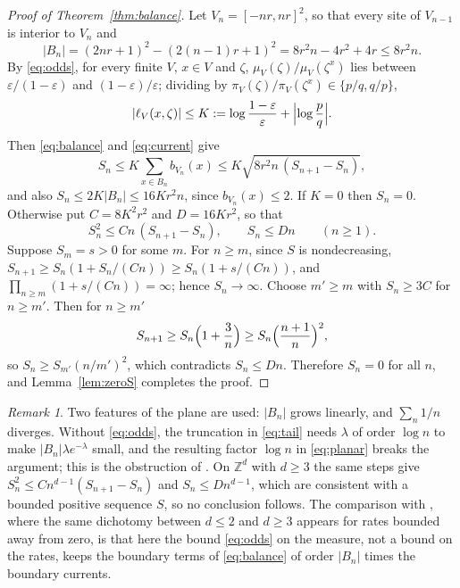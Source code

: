 \documentclass[11pt]{amsart}
\theoremstyle{remark}
\newtheorem{remark}[theorem]{Remark}
\newcommand{\Z}{\mathbb{Z}}
\begin{document}
\begin{proof}[Proof of Theorem~\ref{thm:balance}]
Let $V_n=[-nr,nr]^2$, so that every site of $V_{n-1}$ is interior to $V_n$ and
\begin{equation}\label{eq:shellsize}
|B_n|=(2nr+1)^2-(2(n-1)r+1)^2=8r^2n-4r^2+4r\le8r^2n .
\end{equation}
By \eqref{eq:odds}, for every finite $V$, $x\in V$ and $\zeta$, $\mu_V(\zeta)/\mu_V(\zeta^x)$ lies between
$\varepsilon/(1-\varepsilon)$ and $(1-\varepsilon)/\varepsilon$; dividing by $\pi_V(\zeta)/\pi_V(\zeta^x)\in\{p/q,q/p\}$,
\[
|\ell_V(x,\zeta)|\le K:=\log\frac{1-\varepsilon}{\varepsilon}+\Bigl|\log\frac pq\Bigr| .
\]
Then \eqref{eq:balance} and \eqref{eq:current} give
\begin{equation}\label{eq:planar}
S_n\le K\sum_{x\in B_n}b_{V_n}(x)\le K\sqrt{8r^2n\,(S_{n+1}-S_n)},
\end{equation}
and also $S_n\le 2K|B_n|\le16Kr^2n$, since $b_{V_n}(x)\le2$. If $K=0$ then $S_n=0$. Otherwise put $C=8K^2r^2$ and
$D=16Kr^2$, so that
\[
S_n^2\le Cn\,(S_{n+1}-S_n),\qquad S_n\le Dn\qquad(n\ge1).
\]
Suppose $S_m=s>0$ for some $m$. For $n\ge m$, since $S$ is nondecreasing, $S_{n+1}\ge S_n(1+S_n/(Cn))\ge
S_n(1+s/(Cn))$, and $\prod_{n\ge m}(1+s/(Cn))=\infty$; hence $S_n\to\infty$. Choose $m'\ge m$ with $S_n\ge3C$ for
$n\ge m'$. Then for $n\ge m'$
\[
S_{n+1}\ge S_n\Bigl(1+\frac3n\Bigr)\ge S_n\Bigl(\frac{n+1}n\Bigr)^2,
\]
so $S_n\ge S_{m'}(n/m')^2$, which contradicts $S_n\le Dn$. Therefore $S_n=0$ for all $n$, and Lemma~\ref{lem:zeroS}
completes the proof.
\end{proof}

\begin{remark}\label{rem:dim}
Two features of the plane are used: $|B_n|$ grows linearly, and $\sum_n1/n$ diverges. Without \eqref{eq:odds}, the
truncation in \eqref{eq:tail} needs $\lambda$ of order $\log n$ to make $|B_n|\lambda e^{-\lambda}$ small, and the
resulting factor $\log n$ in \eqref{eq:planar} breaks the argument; this is the obstruction of
\cite[Remark~2.16]{MST25}. On $\Z^d$ with $d\ge3$ the same steps give $S_n^2\le Cn^{d-1}(S_{n+1}-S_n)$ and
$S_n\le Dn^{d-1}$, which are consistent with a bounded positive sequence $S$, so no conclusion follows. The comparison
with \cite{HS77}, where the same dichotomy between $d\le2$ and $d\ge3$ appears for rates bounded away from zero, is
that here the bound \eqref{eq:odds} on the measure, not a bound on the rates, keeps the boundary terms of
\eqref{eq:balance} of order $|B_n|$ times the boundary currents.
\end{remark}
\end{document}
